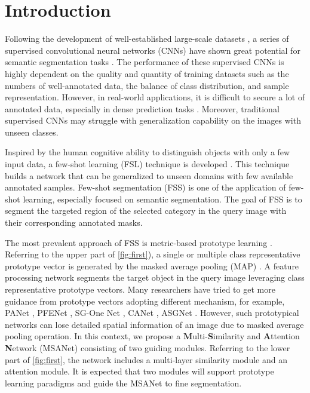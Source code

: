 \documentclass[10pt,twocolumn,letterpaper]{article}
\begin{document}
\section{Introduction}
\label{sec:intro}
Following the development of well-established large-scale datasets \cite{large,coco,pascal,SDS}, a series of supervised convolutional neural networks (CNNs) have shown great potential for semantic segmentation tasks \cite{sem1,sem2,sem3,sem4,accvsem4}. The performance of these supervised CNNs is highly dependent on the quality and quantity of training datasets such as the numbers of well-annotated data, the balance of class distribution, and sample representation. However, in real-world applications, it is difficult to secure a lot of annotated data, especially in dense prediction tasks \cite{inst1,inst2,inst3,inst4,inst5,accvinst6}. Moreover, traditional supervised CNNs may struggle with generalization capability on the images with unseen classes.

Inspired by the human cognitive ability to distinguish objects with only a few input data, a few-shot learning (FSL) technique is developed \cite{FSL1,FSL2,FSL3,FSL4}. This technique builds a network that can be generalized to unseen domains with few available annotated samples. Few-shot segmentation (FSS) \cite{FSS1shaban,FSS2PFE,FSS3,FSS4,FSS5,FSS6crnet,FSS7,FSS8,FSS9Hsnet,FSS10,FSS11,FSS12,FSS13PMM,FSS14scl,FSS15,FSS16,FSS17prototypical} is one of the application of few-shot learning, especially focused on semantic segmentation. The goal of FSS is to segment the targeted region of the selected category in the query image with their corresponding annotated masks.

The most prevalent approach of FSS is metric-based prototype learning \cite{FSS2PFE}. Referring to the upper part of \cref{fig:first}), a single or multiple class representative prototype vector is generated by the masked average pooling (MAP) \cite{FSS19sg}. A feature processing network segments the target object in the query image leveraging class representative prototype vectors. Many researchers have tried to get more guidance from prototype vectors adopting different mechanism, for example, PANet \cite{FSS18panet}, PFENet \cite{FSS2PFE}, SG-One Net \cite{FSS19sg}, CANet \cite{FSS21canet}, ASGNet \cite{FSS20asg}. However, such prototypical networks can lose detailed spatial information of an image due to masked average pooling operation. In this context, we propose a \textbf{M}ulti-\textbf{S}imilarity and \textbf{A}ttention \textbf{N}etwork (MSANet) consisting of two guiding modules. Referring to the lower part of \cref{fig:first}, the network includes a multi-layer similarity module and an attention module. It is expected that two modules will support prototype learning paradigms and guide the MSANet to fine segmentation. 
\end{document}
